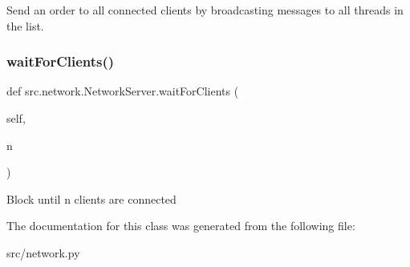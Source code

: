 \begin{DoxyVerb}Send an order to all connected clients by broadcasting messages to
all threads in the list.
\end{DoxyVerb}
 \hypertarget{classsrc_1_1network_1_1_network_server_abaf17f7c7779a3ee271650d17d533743}{}\label{classsrc_1_1network_1_1_network_server_abaf17f7c7779a3ee271650d17d533743} 
\subsubsection{\texorpdfstring{wait\+For\+Clients()}{waitForClients()}}
{\footnotesize\ttfamily def src.\+network.\+Network\+Server.\+wait\+For\+Clients (\begin{DoxyParamCaption}\item[{}]{self,  }\item[{}]{n }\end{DoxyParamCaption})}

\begin{DoxyVerb}Block until n clients are connected \end{DoxyVerb}
 

The documentation for this class was generated from the following file\+:\begin{DoxyCompactItemize}
\item 
src/network.\+py\end{DoxyCompactItemize}
